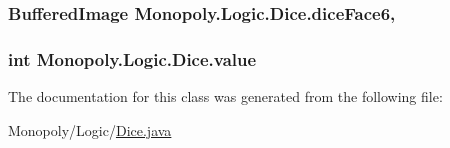 \subsubsection[{\texorpdfstring{dice\+Face6}{diceFace6}}]{\setlength{\rightskip}{0pt plus 5cm}Buffered\+Image Monopoly.\+Logic.\+Dice.\+dice\+Face6\hspace{0.3cm}{\ttfamily [static]}, {\ttfamily [private]}}\hypertarget{class_monopoly_1_1_logic_1_1_dice_a0bef4589a1358dc8502014b5503bd4ee}{}\label{class_monopoly_1_1_logic_1_1_dice_a0bef4589a1358dc8502014b5503bd4ee}
\subsubsection[{\texorpdfstring{value}{value}}]{\setlength{\rightskip}{0pt plus 5cm}int Monopoly.\+Logic.\+Dice.\+value\hspace{0.3cm}{\ttfamily [private]}}\hypertarget{class_monopoly_1_1_logic_1_1_dice_a2d20f27db8eb52b2ca264412dde4b566}{}\label{class_monopoly_1_1_logic_1_1_dice_a2d20f27db8eb52b2ca264412dde4b566}


The documentation for this class was generated from the following file\+:\begin{DoxyCompactItemize}
\item 
Monopoly/\+Logic/\hyperlink{_dice_8java}{Dice.\+java}\end{DoxyCompactItemize}
